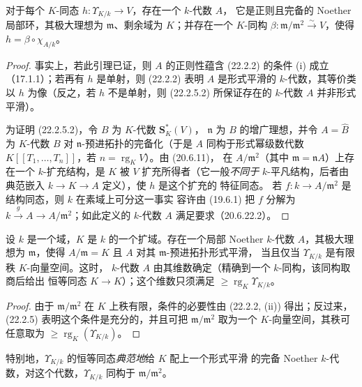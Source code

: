 \begin{lemma}[22.2.5.2]
\label{0.22.2.5.2-fr}
对于每个 $K$-同态 $h:\Upsilon_{K/k}\to V$，存在一个 $k$-代数 $A$，
它是正则且完备的 Noether 局部环，其极大理想为 $\mathfrak m$、剩余域为
$K$；并存在一个 $K$-同构
$\beta:\mathfrak m/\mathfrak m^2\xrightarrow{\sim}V$，使得
$h=\beta\circ\chi_{A/k}$。
\end{lemma}

\begin{proof}
事实上，若此引理已证，则 $A$ 的正则性蕴含 (22.2.2) 的条件 (i) 成立
（17.1.1）；若再有 $h$ 是单射，则 (22.2.2) 表明 $A$ 是形式平滑的
$k$-代数，其等价类以 $h$ 为像（反之，若 $h$ 不是单射，则 (22.2.5.2)
所保证存在的 $k$-代数 $A$ 并非形式平滑）。

为证明 (22.2.5.2)，令 $B$ 为 $K$-代数 $\mathbf S_K^*(V)$，
$\mathfrak n$ 为 $B$ 的增广理想，并令 $A=\widehat B$ 为 $K$-代数
$B$ 对 $\mathfrak n$-预进拓扑的完备化（于是 $A$ 同构于形式幂级数代数
$K[[T_1,\ldots,T_n]]$，若 $n=\operatorname{rg}_KV$）。由 (20.6.11)，
在 $A/\mathfrak m^2$（其中 $\mathfrak m=\mathfrak nA$）上存在一个
$k$-扩充结构，是 $K$ 被 $V$ 扩充所得者（它一般\emph{不同于}
$k$-平凡结构，后者由典范嵌入 $k\to K\to A$ 定义），使 $h$ 是这个扩充的
特征同态。
若 $f:k\to A/\mathfrak m^2$ 是结构同态，则 $k$ 在素域上可分这一事实
容许由 (19.6.1) 把 $f$ 分解为
$k\xrightarrow{g}A\to A/\mathfrak m^2$；如此定义的 $k$-代数 $A$
满足要求（20.6.22.2）。
\end{proof}

\begin{theorem}[22.2.6]
\label{0.22.2.6-fr}
设 $k$ 是一个域，$K$ 是 $k$ 的一个扩域。存在一个局部 Noether
$k$-代数 $A$，其极大理想为 $\mathfrak m$，使得
$A/\mathfrak m=K$ 且 $A$ 对其 $\mathfrak m$-预进拓扑形式平滑，
当且仅当 $\Upsilon_{K/k}$ 是有限秩 $K$-向量空间。这时，
$k$-代数 $A$ 由其维数确定（精确到一个 $k$-同构，该同构取商后给出
恒等同态 $K\to K$）；这个维数只须满足
$\geqslant\operatorname{rg}_K\Upsilon_{K/k}$。
\end{theorem}

\begin{proof}
由于 $\mathfrak m/\mathfrak m^2$ 在 $K$ 上秩有限，条件的必要性由
(22.2.2, (ii)) 得出；反过来，(22.2.5) 表明这个条件是充分的，并且可把
$\mathfrak m/\mathfrak m^2$ 取为一个 $K$-向量空间，其秩可任意取为
$\geqslant\operatorname{rg}_K(\Upsilon_{K/k})$。
\end{proof}


特别地，$\Upsilon_{K/k}$ 的恒等同态\emph{典范地}给 $K$ 配上一个形式平滑
的完备 Noether $k$-代数，对这个代数，$\Upsilon_{K/k}$ 同构于
$\mathfrak m/\mathfrak m^2$。

